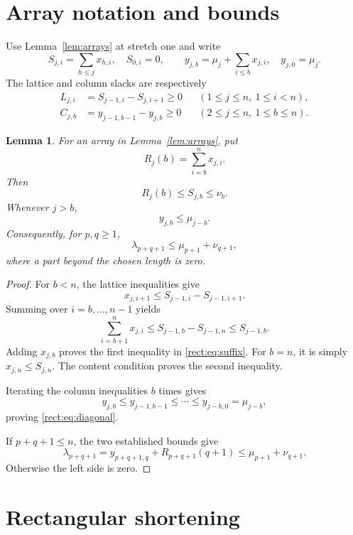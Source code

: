 \documentclass[11pt]{article}
\newtheorem{lemma}[theorem]{Lemma}
\begin{document}
\section{Array notation and bounds}
Use Lemma~\ref{lem:arrays} at stretch one and write
\[
 S_{j,i}=\sum_{h\le j}x_{h,i},\quad S_{0,i}=0,\qquad
 y_{j,b}=\mu_j+\sum_{i\le b}x_{j,i},\quad y_{j,0}=\mu_j.
\]
The lattice and column slacks are respectively
\begin{align}
 L_{j,i}&=S_{j-1,i}-S_{j,i+1}\ge0
       &&(1\le j\le n,\ 1\le i<n),\label{rect:eq:lattice}\\
 C_{j,b}&=y_{j-1,b-1}-y_{j,b}\ge0
       &&(2\le j\le n,\ 1\le b\le n).\label{rect:eq:columns}
\end{align}

\begin{lemma}\label{rect:lem:bounds}
For an array in Lemma~\ref{lem:arrays}, put
\[
R_j(b)=\sum_{i=b}^{n}x_{j,i}.
\]
Then
\begin{equation}\label{rect:eq:suffix}
R_j(b)\le S_{j,b}\le\nu_b.
\end{equation}
Whenever $j>b$,
\begin{equation}\label{rect:eq:diagonal}
y_{j,b}\le\mu_{j-b}.
\end{equation}
Consequently, for $p,q\ge1$,
\begin{equation}\label{rect:eq:weyl}
\lambda_{p+q+1}\le\mu_{p+1}+\nu_{q+1},
\end{equation}
where a part beyond the chosen length is zero.
\end{lemma}

\begin{proof}
For $b<n$, the lattice inequalities give
\[
x_{j,i+1}\le S_{j-1,i}-S_{j-1,i+1}.
\]
Summing over $i=b,\ldots,n-1$ yields
\[
\sum_{i=b+1}^{n}x_{j,i}
 \le S_{j-1,b}-S_{j-1,n}
 \le S_{j-1,b}.
\]
Adding $x_{j,b}$ proves the first inequality in
\eqref{rect:eq:suffix}. For $b=n$, it is simply
$x_{j,n}\le S_{j,n}$. The content condition proves
the second inequality.

Iterating the column inequalities $b$ times gives
\[
y_{j,b}\le y_{j-1,b-1}\le\cdots
 \le y_{j-b,0}=\mu_{j-b},
\]
proving \eqref{rect:eq:diagonal}.

If $p+q+1\le n$, the two established bounds give
\[
\lambda_{p+q+1}
 =y_{p+q+1,q}+R_{p+q+1}(q+1)
 \le\mu_{p+1}+\nu_{q+1}.
\]
Otherwise the left side is zero.
\end{proof}

\section{Rectangular shortening}
\end{document}
